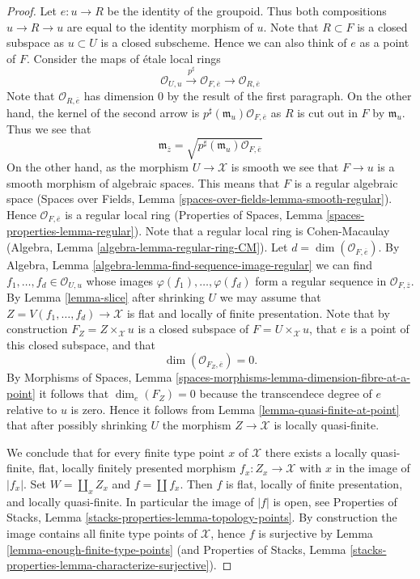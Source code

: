 \begin{proof}
\medskip\noindent
Let $e : u \to R$ be the identity of the groupoid. Thus both compositions
$u \to R \to u$ are equal to the identity morphism of $u$.
Note that $R \subset F$ is a closed
subspace as $u \subset U$ is a closed subscheme. Hence we can also think
of $e$ as a point of $F$. Consider the maps of \'etale local rings
$$
\mathcal{O}_{U, u}
\xrightarrow{p^\sharp}
\mathcal{O}_{F, \overline{e}}
\longrightarrow
\mathcal{O}_{R, \overline{e}}
$$
Note that $\mathcal{O}_{R, \overline{e}}$ has dimension $0$ by the result
of the first paragraph. On the other hand, the kernel of the second arrow is
$p^\sharp(\mathfrak m_u)\mathcal{O}_{F, \overline{e}}$ as
$R$ is cut out in $F$ by $\mathfrak m_u$. Thus we see that
$$
\mathfrak m_{\overline{z}} =
\sqrt{p^\sharp(\mathfrak m_u)\mathcal{O}_{F, \overline{e}}}
$$
On the other hand, as the morphism $U \to \mathcal{X}$ is smooth
we see that $F \to u$ is a smooth morphism of algebraic spaces.
This means that $F$ is a regular algebraic space
(Spaces over Fields, Lemma \ref{spaces-over-fields-lemma-smooth-regular}).
Hence $\mathcal{O}_{F, \overline{e}}$ is a regular local ring
(Properties of Spaces, Lemma \ref{spaces-properties-lemma-regular}).
Note that a regular local ring is Cohen-Macaulay
(Algebra, Lemma \ref{algebra-lemma-regular-ring-CM}).
Let $d = \dim(\mathcal{O}_{F, \overline{e}})$. By
Algebra, Lemma \ref{algebra-lemma-find-sequence-image-regular}
we can find $f_1, \ldots, f_d \in \mathcal{O}_{U, u}$ whose images
$\varphi(f_1), \ldots, \varphi(f_d)$ form a regular sequence
in $\mathcal{O}_{F, \overline{z}}$. By
Lemma \ref{lemma-slice}
after shrinking $U$ we may assume that
$Z = V(f_1, \ldots, f_d) \to \mathcal{X}$ is flat and
locally of finite presentation. Note that by construction
$F_Z = Z \times_\mathcal{X} u$ is a closed subspace of
$F = U \times_\mathcal{X} u$, that $e$ is a point of this closed subspace,
and that
$$
\dim(\mathcal{O}_{F_Z, \overline{e}}) = 0.
$$
By
Morphisms of Spaces,
Lemma \ref{spaces-morphisms-lemma-dimension-fibre-at-a-point}
it follows that $\dim_e(F_Z) = 0$ because the transcendece degree
of $e$ relative to $u$ is zero. Hence it follows from
Lemma \ref{lemma-quasi-finite-at-point}
that after possibly shrinking $U$ the morphism $Z \to \mathcal{X}$
is locally quasi-finite.

\medskip\noindent
We conclude that for every finite type point $x$ of $\mathcal{X}$ there
exists a locally quasi-finite, flat, locally finitely presented
morphism $f_x : Z_x \to \mathcal{X}$ with $x$ in the image of $|f_x|$.
Set $W = \coprod_x Z_x$ and $f = \coprod f_x$. Then $f$ is flat, locally
of finite presentation, and locally quasi-finite. In particular the
image of $|f|$ is open, see
Properties of Stacks, Lemma \ref{stacks-properties-lemma-topology-points}.
By construction the image contains all finite type points of $\mathcal{X}$,
hence $f$ is surjective by
Lemma \ref{lemma-enough-finite-type-points} (and
Properties of Stacks, Lemma
\ref{stacks-properties-lemma-characterize-surjective}).
\end{proof}

